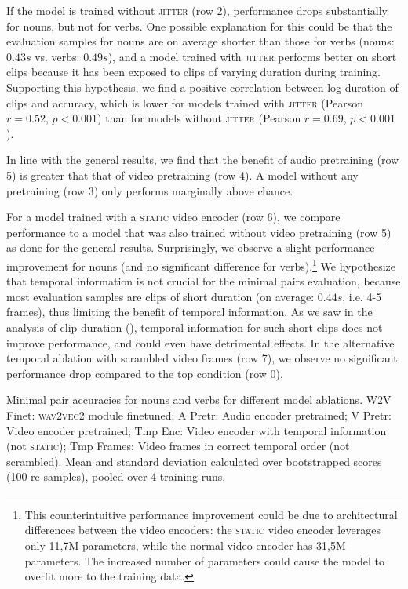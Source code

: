 If the model is trained without \textsc{jitter} (row 2), performance drops substantially
for nouns, but not for verbs. One possible explanation for this could be that 
the evaluation samples for nouns are on average shorter than those for verbs 
(nouns: $0.43s$ vs. verbs: $0.49s$), and a model trained with \textsc{jitter} 
performs better on short clips because it has been exposed to clips of varying 
duration during training. Supporting this hypothesis, we find a positive 
correlation between log duration of clips and accuracy, which is lower for 
models trained with \textsc{jitter} (Pearson $r= 0.52$, $p < 0.001$) than for 
models without \textsc{jitter} (Pearson $r= 0.69$, $p < 0.001$).

In line with the general results, we find that the benefit of audio pretraining 
(row 5) is greater that that of video pretraining (row 4). A model without any 
pretraining (row 3) only performs marginally above chance.

For a model trained with a \textsc{static} video encoder (row 6), we compare 
performance to a model that was also trained without video pretraining (row 5) 
as done for the general results. Surprisingly, we observe a slight performance 
improvement for nouns (and no significant difference for verbs).\footnote{This 
counterintuitive performance improvement could be due to architectural differences 
between the video encoders: the \textsc{static} video encoder leverages only 11,7M 
parameters, while the normal video encoder has 31,5M parameters. The increased 
number of parameters could cause the model to overfit more to the training data.} 
We hypothesize 
that temporal information is not crucial for the minimal pairs evaluation, 
because most evaluation samples are clips of short duration (on average: 
$0.44s$, i.e. 4-5 frames), thus limiting the benefit of temporal information.
As we saw in the analysis of clip duration (), 
temporal information for such short clips does not improve performance, and 
could even have detrimental effects. In the alternative temporal ablation 
with scrambled video frames (row 7), we observe no significant performance 
drop compared to the top condition (row 0).
\begin{table}[htb]
	\centering
	
	\caption{Minimal pair accuracies for nouns and verbs for different model 
		ablations. W2V Finet: \textsc{wav2vec2} module finetuned; A Pretr: 
		Audio encoder pretrained; V Pretr: Video encoder pretrained; Tmp 
		Enc: Video encoder with temporal information (not \textsc{static}); 
		Tmp Frames: Video frames in correct temporal order (not scrambled). 
		Mean and standard 
		deviation calculated over bootstrapped scores (100 re-samples), pooled 
		over 4 training runs.}
	\label{tab:minimal_pair_results}
\end{table}


